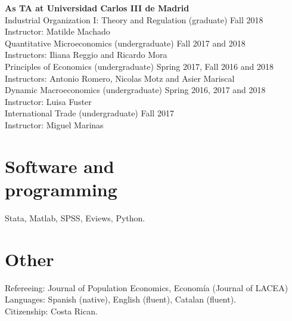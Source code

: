\documentclass[margin]{res} %
\begin{document}
\begin{resume}
{\bf As TA at Universidad Carlos III de Madrid} \\
Industrial Organization I: Theory and Regulation (graduate) \hfill Fall 2018 \\
Instructor: Matilde Machado \\
Quantitative Microeconomics (undergraduate) \hfill Fall 2017 and 2018 \\
Instructors: Iliana Reggio and Ricardo Mora \\
Principles of Economics (undergraduate) \hfill Spring 2017, Fall 2016 and 2018 \\
Instructors: Antonio Romero, Nicolas Motz and Asier Mariscal \\
Dynamic Macroeconomics (undergraduate) \hfill Spring 2016, 2017 and 2018 \\
Instructor: Luisa Fuster \\
International Trade (undergraduate) \hfill Fall 2017 \\ 
Instructor: Miguel Marinas 

%

\section{Software and \\ programming}
Stata, Matlab, SPSS, Eviews, Python. \\

\section{Other}
Refereeing: Journal of Population Economics, Econom\'ia (Journal of LACEA) \\
Languages: Spanish (native), English (fluent), Catalan (fluent). \\
Citizenship: Costa Rican.





\end{resume}
\end{document}
